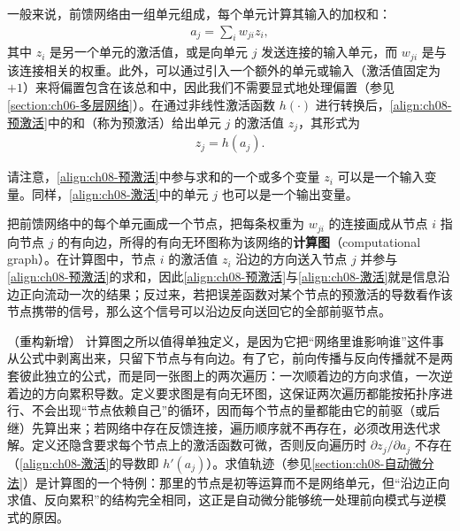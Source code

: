 \documentclass[../../main.tex]{subfiles}
\begin{document}
一般来说，前馈网络由一组单元组成，每个单元计算其输入的加权和：
\begin{align}
a_j=\sum_{i}w_{ji}z_i,
\label{align:ch08-预激活}
\end{align}
其中 $z_i$ 是另一个单元的激活值，或是向单元 $j$ 发送连接的输入单元，而 $w_{ji}$ 是与该连接相关的权重。此外，可以通过引入一个额外的单元或输入（激活值固定为 $+1$）来将偏置包含在该总和中，因此我们不需要显式地处理偏置（参见\cref{section:ch06-多层网络}）。在通过非线性激活函数 $h(\cdot)$ 进行转换后，\eqref{align:ch08-预激活}中的和（称为预激活）给出单元 $j$ 的激活值 $z_j$，其形式为
\begin{align}
z_j=h(a_j).
\label{align:ch08-激活}
\end{align}

请注意，\eqref{align:ch08-预激活}中参与求和的一个或多个变量 $z_i$ 可以是一个输入变量。同样，\eqref{align:ch08-激活}中的单元 $j$ 也可以是一个输出变量。

\begin{definition}[计算图]\label{definition:ch08-计算图}
把前馈网络中的每个单元画成一个节点，把每条权重为 $w_{ji}$ 的连接画成从节点 $i$ 指向节点 $j$ 的有向边，所得的有向无环图称为该网络的\textbf{计算图}（computational graph）。在计算图中，节点 $i$ 的激活值 $z_i$ 沿边的方向送入节点 $j$ 并参与\eqref{align:ch08-预激活}的求和，因此\eqref{align:ch08-预激活}与\eqref{align:ch08-激活}就是信息沿边正向流动一次的结果；反过来，若把误差函数对某个节点的预激活的导数看作该节点携带的信号，那么这个信号可以沿边反向送回它的全部前驱节点。
\end{definition}

\begin{remark}（重构新增）
计算图之所以值得单独定义，是因为它把“网络里谁影响谁”这件事从公式中剥离出来，只留下节点与有向边。有了它，前向传播与反向传播就不是两套彼此独立的公式，而是同一张图上的两次遍历：一次顺着边的方向求值，一次逆着边的方向累积导数。定义要求图是有向无环图，这保证两次遍历都能按拓扑序进行、不会出现“节点依赖自己”的循环，因而每个节点的量都能由它的前驱（或后继）先算出来；若网络中存在反馈连接，遍历顺序就不再存在，必须改用迭代求解。定义还隐含要求每个节点上的激活函数可微，否则反向遍历时 $\partial z_j/\partial a_j$ 不存在（\eqref{align:ch08-激活}的导数即 $h'(a_j)$）。求值轨迹（参见\cref{section:ch08-自动微分法}）是计算图的一个特例：那里的节点是初等运算而不是网络单元，但“沿边正向求值、反向累积”的结构完全相同，这正是自动微分能够统一处理前向模式与逆模式的原因。
\end{remark}
\end{document}
